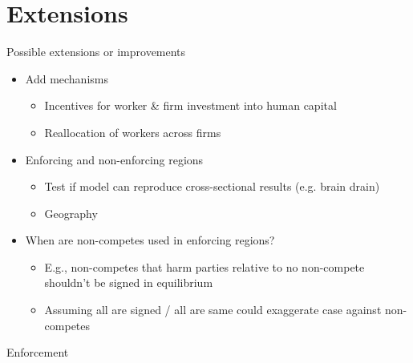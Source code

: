 \documentclass[english,usenames,dvipsnames]{beamer}
\begin{document}
\section{Extensions}
\begin{frame}{Possible extensions or improvements}
\begin{itemize}
	\item Add mechanisms
	\begin{itemize}
		\item Incentives for worker \& firm investment into human capital
		\item Reallocation of workers across firms 
	\end{itemize}
	\item Enforcing and non-enforcing regions
	\begin{itemize}
		\item Test if model can reproduce cross-sectional results (e.g. brain drain)
		\item Geography
	\end{itemize}
	\item When are non-competes used in enforcing regions?
	\begin{itemize}
		\item E.g., non-competes that harm parties relative to no non-compete shouldn't be signed in equilibrium
		\item Assuming all are signed / all are same could exaggerate case against non-competes
	\end{itemize}
\end{itemize}
\end{frame}


\begin{frame}{Enforcement}\label{mapofenforcement}
\hyperlink{Motivation}{}

	
	
\end{frame}
\end{document}
